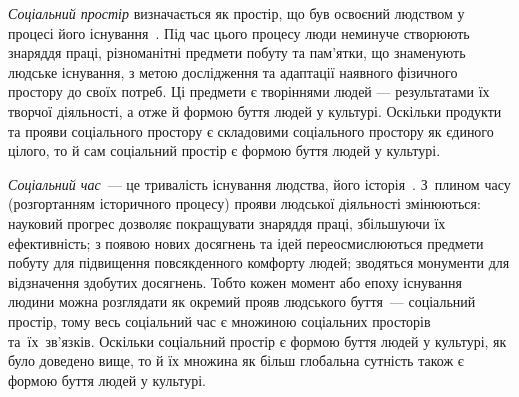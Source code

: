 \documentclass[a4paper,oneside,DIV = 12, 12pt, headings = normal]{scrartcl}
\begin{document}
		\emph{Соціальний простір} визначається як простір, що був освоєний людством у процесі його існування~\cite[251]{drotyanko-textbook}. Під час цього процесу люди неминуче створюють знаряддя праці, різноманітні предмети побуту та пам'ятки, що знаменують людське існування, з метою дослідження та адаптації наявного фізичного простору до своїх потреб. Ці предмети є творіннями людей — результатами їх творчої діяльності, а отже й формою буття людей у культурі. Оскільки продукти та прояви соціального простору є складовими соціального простору як єдиного цілого, то й сам соціальний простір є формою буття людей у культурі.
		
		\emph{Соціальний час}~— це тривалість існування людства, його історія~\cite[252]{drotyanko-textbook}. З~плином часу (розгортанням історичного процесу) прояви людської діяльності змінюються: науковий прогрес дозволяє покращувати знаряддя праці, збільшуючи їх ефективність; з появою нових досягнень та ідей переосмислюються предмети побуту для підвищення повсякденного комфорту людей; зводяться монументи для відзначення здобутих досягнень. Тобто кожен момент або епоху існування людини можна розглядати як окремий прояв людського буття~— соціальний простір, тому весь соціальний час є множиною соціальних просторів та~їх~зв'язків. Оскільки соціальний простір є формою буття людей у культурі, як було доведено вище, то й їх множина як більш глобальна сутність також є формою буття людей у культурі.
	
	\printbibliography
	
\end{document}
